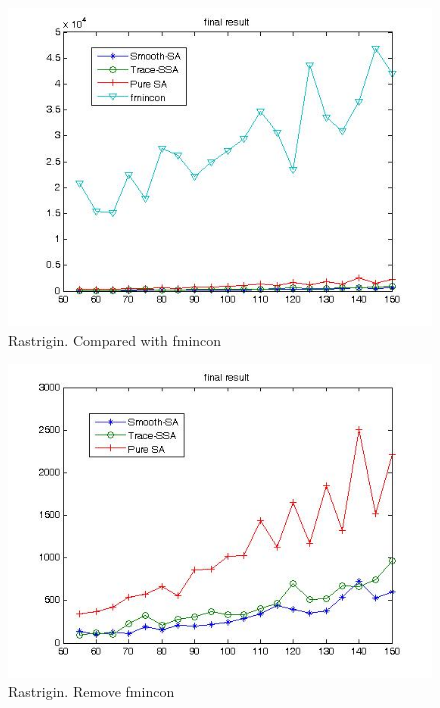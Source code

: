\documentclass[hyperref={pdfpagelabels=false}]{beamer}
\begin{document}

\begin{frame}
\begin{figure}
\includegraphics[scale=0.45]{result4.jpg}
\caption{Rastrigin. Compared with fmincon}
\end{figure}
\end{frame}


\begin{frame}
\begin{figure}
\includegraphics[scale=0.45]{result5.jpg}
\caption{Rastrigin. Remove fmincon}
\end{figure}
\end{frame}
\end{document}
